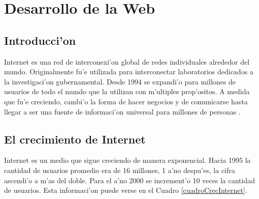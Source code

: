 \chapter{Desarrollo de la Web}
\label{desarrolloWeb}
\section{Introducci'on}

Internet es una red de interconexi'on global de redes individuales alrededor del mundo. Originalmente fu'e utilizada para interconectar laboratorios dedicados a la investigaci'on gubernamental. Desde 1994 se expandi'o para millones de usuarios de todo el mundo que la utilizan con m'ultiples prop'ositos. A medida que fu'e creciendo, cambi'o la forma de hacer negocios y de comunicarse hasta llegar a ser una fuente de informaci'on universal para millones de personas \citep{iws}.

\section{El crecimiento de Internet}

Internet es un medio que sigue creciendo de manera exponencial. Hacia 1995 la cantidad de usuarios promedio era de 16 millones, 1 a'no despu'es, la cifra ascendi'o a m'as del doble. Para el a'no 2000 se increment'o 10 veces la cantidad de usuarios. Esta informaci'on puede verse en el Cuadro \ref{cuadroCrecInternet}.

\clearpage

